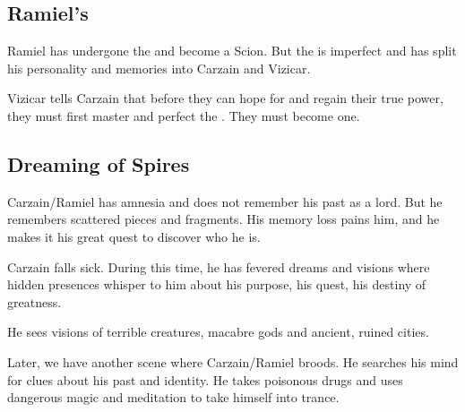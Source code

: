 \begin{garbage}
\subsection{Ramiel's \Kenosis}
Ramiel has undergone the \hs{\Kenosis} and become a Scion. 
But the \Kenosis{} is imperfect and has split his personality and memories into Carzain and Vizicar. 

Vizicar tells Carzain that before they can hope for \hs{\Apotheosis} and regain their true power, they must first master and perfect the \Kenosis. 
They must become one. 









\subsection{Dreaming of \Cuezcan{} Spires}
Carzain/Ramiel has amnesia and does not remember his past as a \resphan{} lord. But he remembers scattered pieces and fragments. His memory loss pains him, and he makes it his great quest to discover who he is. 

Carzain falls sick. During this time, he has fevered dreams and visions where hidden presences whisper to him about his purpose, his quest, his destiny of greatness. 

He sees visions of terrible creatures, macabre gods and ancient, ruined cities. 

Later, we have another scene where Carzain/Ramiel broods. He searches his mind for clues about his past and identity. He takes poisonous drugs and uses dangerous magic and meditation to take himself into trance.


\end{garbage}
